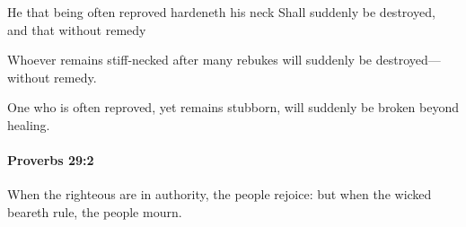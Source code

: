 			\begin{versebox}
					\item[BHS] 
					\item[ASV] He that being often reproved hardeneth his neck Shall suddenly be destroyed, and that without remedy
					\item[NIV] Whoever remains stiff-necked after many rebukes will suddenly be destroyed—without remedy.
					\item[NRSV] One who is often reproved, yet remains stubborn, will suddenly be broken beyond healing.
			\end{versebox}

		\paragraph{Proverbs 29:2} %
			\label{PROVERBS-29-2}

			When the righteous are in authority, the people rejoice: but when the wicked beareth rule, the people mourn.

